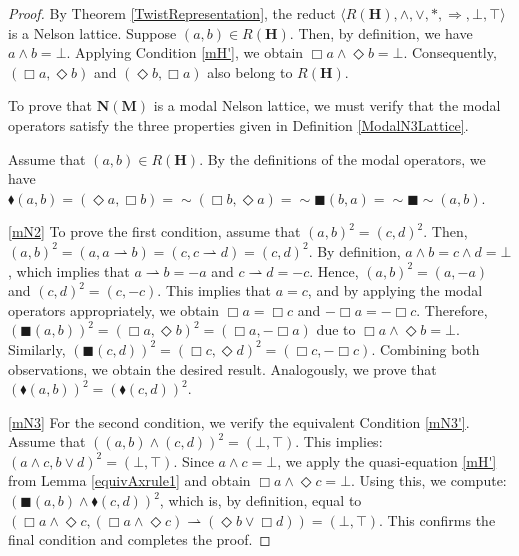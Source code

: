 \documentclass[pdflatex,sn-mathphys-num]{sn-jnl}%
\newcommand{\To}{\Rightarrow}
\theoremstyle{thmstyleone}%
\theoremstyle{thmstyletwo}%
\theoremstyle{thmstylethree}%
\begin{document}
\begin{proof}
    By Theorem \ref{TwistRepresentation}, the reduct $\langle R(\mathbf{H}),\wedge,\vee, *, \To,\bot,\top\rangle$ is a Nelson lattice. Suppose $(a,b) \in R(\mathbf{H})$. Then, by definition, we have $a \wedge b = \bot$. Applying Condition \eqref{mH'}, we obtain $\Box a \wedge \Diamond b = \bot$. Consequently, $(\Box a, \Diamond b)$ and $(\Diamond b, \Box a)$ also belong to $R(\mathbf{H})$.

    To prove that $\mathbf{N}(\mathbf{M})$ is a modal Nelson lattice, we must verify that the modal operators satisfy the three properties given in Definition \ref{ModalN3Lattice}.   

     Assume that $(a,b) \in R(\mathbf{H})$. By the definitions of the modal operators, we have $\blacklozenge(a,b) = ( \Diamond a, \Box b) = \sim (\Box b, \Diamond a) = \sim \blacksquare (b,a) = \sim\blacksquare \sim (a,b)$.

     \eqref{mN2}  To prove the first condition, assume that $(a,b)^2=(c,d)^2$. Then, $(a,b)^2=(a, a \rightharpoonup b) = (c, c \rightharpoonup d) = (c,d)^2$. By definition, $a \wedge b = c \wedge d = \bot$, which implies that $a \rightharpoonup b = - a$ and $c \rightharpoonup d = - c$. Hence, $(a,b)^2=(a, - a)$ and $(c,d)^2=(c,- c)$. This implies that $a=c$, and by applying the modal operators appropriately, we obtain $\Box a = \Box c $ and $- \Box a= - \Box c$. Therefore, $(\blacksquare(a,b))^2 = (\Box a, \Diamond b)^2 = (\Box a, - \Box a)$ due to $\Box a \wedge \Diamond b = \bot$. Similarly, $(\blacksquare(c,d))^2 = (\Box c, \Diamond d)^2 = (\Box c, - \Box c)$. Combining both observations, we obtain the desired result. Analogously, we prove that $(\blacklozenge (a,b))^2=(\blacklozenge (c,d))^2$.

    \eqref{mN3} For the second condition, we verify the equivalent Condition \eqref{mN3'}. Assume that $((a,b) \wedge (c,d))^2= (\bot,\top)$. This implies: $(a \wedge c, b \vee d)^2 = (\bot,\top)$. Since $a \wedge c = \bot$, we apply the quasi-equation \eqref{mH'} from Lemma \ref{equivAxrule1} and obtain $\Box a \wedge \Diamond c = \bot$.  Using this, we compute: $(\blacksquare(a,b) \wedge \blacklozenge(c,d))^2$, which is, by definition, equal to $(\Box a \wedge \Diamond c, (\Box a \wedge \Diamond c) \rightharpoonup (\Diamond b \vee \Box d)) = (\bot,\top)$.
   This confirms the final condition and completes the proof.
\end{proof}
\end{document}
